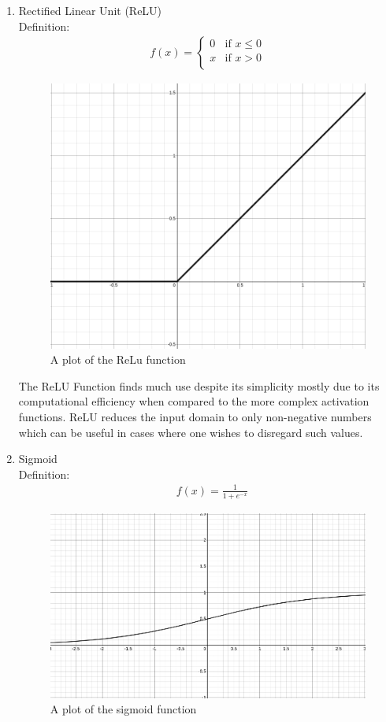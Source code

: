 \documentclass{article}
\begin{document}
\begin{enumerate}
\item Rectified Linear Unit (ReLU)\\
Definition: 
\begin{align*}
f(x) =
\begin{cases}
 0 & \text{if } x \leq 0 \\
 x & \text{if } x > 0 \\
\end{cases}
\end{align*}
\begin{figure}[H]
\centering
\caption{A plot of the ReLu function}
\includegraphics[scale=0.2]{relu.png}
\end{figure}
The ReLU Function finds much use despite its simplicity mostly due to its computational efficiency when compared to the more complex activation functions. ReLU reduces the input domain to only non-negative numbers which can be useful in cases where one wishes to disregard such values. 
\item Sigmoid \\
Definition: 
\begin{align*}
&f(x) = \frac{1}{1 + e^{-x}}
\end{align*}
\begin{figure}[H]
\centering
\caption{A plot of the sigmoid function}
\includegraphics[scale=0.2]{sigmoid.png}

\end{figure}
\end{enumerate}
\end{document}
